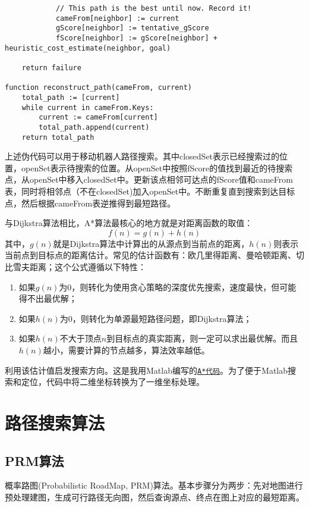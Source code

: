 \begin{lstlisting}
            // This path is the best until now. Record it!
            cameFrom[neighbor] := current
            gScore[neighbor] := tentative_gScore
            fScore[neighbor] := gScore[neighbor] + heuristic_cost_estimate(neighbor, goal) 

    return failure

function reconstruct_path(cameFrom, current)
    total_path := [current]
    while current in cameFrom.Keys:
        current := cameFrom[current]
        total_path.append(current)
    return total_path
\end{lstlisting}
上述伪代码可以用于移动机器人路径搜索。其中closedSet表示已经搜索过的位置，openSet表示待搜索的位置。从openSet中按照fScore的值找到最近的待搜索点，从openSet中移入closedSet中。更新该点相邻可达点的fScore值和cameFrom表，同时将相邻点（不在closedSet)加入openSet中。不断重复直到搜索到达目标点，然后根据cameFrom表逆推得到最短路径。

与Dijkstra算法相比，A*算法最核心的地方就是对距离函数的取值：
\begin{equation*}
	f(n) = g(n) + h(n)
\end{equation*}
其中，$g(n)$就是Dijkstra算法中计算出的从源点到当前点的距离，$h(n)$则表示当前点到目标点的距离估计。常见的估计函数有：欧几里得距离、曼哈顿距离、切比雪夫距离；这个公式遵循以下特性：
\begin{enumerate}
\item 如果$g(n)$为0，则转化为使用贪心策略的深度优先搜索，速度最快，但可能得不出最优解；
\item 如果$h(n)$为0，则转化为单源最短路径问题，即Dijkstra算法；
\item {\color{red} 如果$h(n)$不大于顶点$n$到目标点的真实距离，则一定可以求出最优解}。而且$h(n)$越小，需要计算的节点越多，算法效率越低。
\end{enumerate}

利用该估计值启发搜索方向。这是我用Matlab编写的\href{/attachment/myastar.m}{\texttt{A*代码}}。为了便于Matlab搜索和定位，代码中将二维坐标转换为了一维坐标处理。

\section{路径搜索算法}
\subsection{PRM算法}
概率路图(Probabilistic RoadMap, PRM)算法。基本步骤分为两步：先对地图进行预处理建图，生成可行路径无向图，然后查询源点、终点在图上对应的最短距离。

